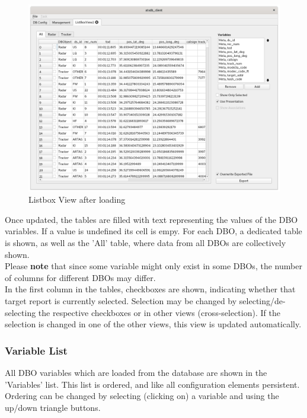 \begin{figure}[H]
    \hspace*{-2cm}
    \includegraphics[width=18cm,frame]{../screenshots/listbox_loaded.png}
  \caption{Listbox View after loading}
  \label{fig:listbox_load}
\end{figure}

Once updated, the tables are filled with text representing the values of the DBO variables.  If a value is undefined its cell is empy. For each DBO, a dedicated table is shown, as well as the 'All' table, where data from all DBOs are collectively shown. \\

Please \textbf{note} that since some variable might only exist in some DBOs, the number of columns for different DBOs may differ. \\

In the first column in the tables, checkboxes are shown, indicating whether that target report is currently selected. Selection may be changed by selecting/de-selecting the respective checkboxes or in other views (cross-selection). If the selection is changed in one of the other views, this view is updated automatically.

\subsubsection{Variable List}
All DBO variables which are loaded from the database are shown in the 'Variables' list. This list is ordered, and like all configuration elements persistent. Ordering can be changed by selecting (clicking on) a variable and using the up/down triangle buttons. \\


